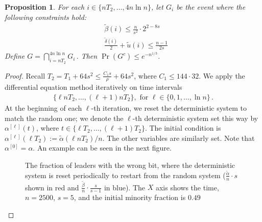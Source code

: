 \documentclass[a4paper,12pt]{article}
\newtheorem{proposition}{Proposition}
\begin{document}
\begin{proposition} \label{prop:warnke_app}
For each $i \in \{n T_2, \ldots, 4n \ln{n}\}$, let $G_i$ be the event where the following constraints hold:
	\begin{align}
	& \widetilde{\beta}(i) \leq \frac{n}{s^2} \cdot {2^{2-8s}} \\
	& \frac{\widetilde{\delta}(i)}{2} + \widetilde{u}(i) \leq \frac{n-1}{2s}
	\end{align}
Define
$G = \bigcap_{i = nT_2}^{4n \ln{n}} G_i\,.$
Then $\Pr(G^c) \leq e^{-n^{1/3}}$.
\end{proposition}
\begin{proof}
Recall $T_2 = T_1 + 64 s^2 \leq \frac{C_1 s}{\rho} + 64 s^2$, where $C_1 \leq 144 \cdot 32$.
We apply the differential equation method iteratively on time intervals
\begin{align}
\{\ell nT_2, \ldots, (\ell+1)nT_2\}, \mbox{ for } \ell \in \{0, 1,\ldots, \ln{n}\}\,.
\end{align}
At the beginning of each $\ell$-th iteration, we reset the deterministic system to match the random one; we denote the $\ell$-th deterministic system set this way by $\alpha^{[\ell]}(t)$, where $t \in \{\ell T_2, \ldots, (\ell +1)T_2\}$. The initial condition is $\alpha^{[\ell ]}(\ell T_2) := \widetilde{\alpha}(\ell nT_2)/n$. The other variables are similarly set. Note that $\alpha^{[0]} = \alpha$. An example can be seen in the next figure.

\begin{figure}[h!]
	\centering
	\caption{The fraction of leaders with the wrong bit, where the deterministic system is reset periodically to restart from the random system ($\frac{\widetilde{\alpha}}{n} \cdot s$ shown in red and $\frac{\widetilde{\beta}}{n} \cdot \frac{s}{s-1}$ in blue). The $X$ axis shows the time, $n = 2500$, $s=5$, and the initial minority fraction is $0.49$}
\end{figure}



\end{proof}
\end{document}

